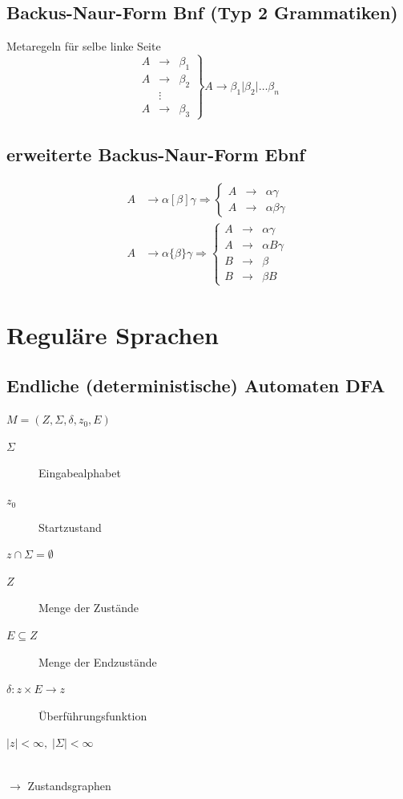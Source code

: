 \documentclass{scrartcl}
\begin{document}
\subsection*{Backus-Naur-Form Bnf (Typ 2 Grammatiken)}
Metaregeln für selbe linke Seite
\[
\left. \begin{array}{ccc}
A & \to    & \beta_1 \\
A & \to    & \beta_2 \\
  & \vdots &         \\
A & \to    & \beta_3
\end{array} \right\rbrace A\to\beta_1\vert\beta_2\vert\ldots\beta_n
\]

\subsection*{erweiterte Backus-Naur-Form Ebnf}
\begin{align*}
A &\to \alpha[\beta]\gamma \Rightarrow \left\lbrace
\begin{array}{ccc}
A & \to & \alpha\gamma \\
A & \to & \alpha\beta\gamma
\end{array}
\right. \\
A &\to \alpha\{\beta\}\gamma \Rightarrow \left\lbrace
\begin{array}{ccc}
A & \to & \alpha\gamma \\
A & \to & \alpha B\gamma \\
B & \to & \beta \\
B & \to & \beta B
\end{array}
\right.
\end{align*}

\section*{Reguläre Sprachen}
\subsection*{Endliche (deterministische) Automaten DFA}
\begin{minipage}{6cm}
    $M = \left(Z,\Sigma,\delta,z_0,E\right)$
    \begin{description}
        \item[$\Sigma$] Eingabealphabet
        \item[$z_0$] Startzustand
        \item[$z\cap\Sigma = \emptyset$]
    \end{description}
\end{minipage}
\begin{minipage}{5.5cm}
\begin{description}
    \item[$Z$] Menge der Zustände
    \item[$E\subseteq Z$] Menge der Endzustände
    \item[$\delta: z\times E\to z$] Überführungsfunktion
    \item[$|z|< \infty,\; |\Sigma |<\infty$]
\end{description}
\end{minipage}\\
$\to$ Zustandsgraphen
\end{document}
